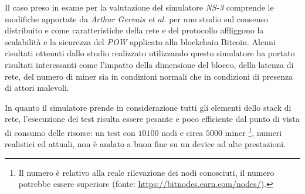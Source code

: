 Il caso preso in esame per la valutazione del simulatore \textit{NS-3} comprende le modifiche apportate da \textit{Arthur Gervais et al.} per uno studio sul consenso distribuito e come caratteristiche della rete e del protocollo affliggono la scalabilità e la sicurezza del \textit{POW} applicato alla blockchain Bitcoin.\newline
Alcuni risultati ottenuti dallo studio realizzato utilizzando questo simulatore ha portato risultati interessanti come l'impatto della dimensione del blocco, della latenza di rete, del numero di miner sia in condizioni normali che in condizioni di presenza di attori malevoli.
\begin{table}
    \centering
    \caption{Numero di blocchi \textit{stale} e transazioni per secondo raggiungibili con 16 miner nella rete e diverse dimensioni dei blocchi}
\end{table}
In quanto il simulatore prende in considerazione tutti gli elementi dello stack di rete, l'esecuzione dei test risulta essere pesante e poco efficiente dal punto di vista di consumo delle risorse: un test con $10100$ nodi e circa $5000$ miner \footnote{Il numero è relativo alla reale rilevazione dei nodi conosciuti, il numero potrebbe essere superiore (fonte: \href{https://bitnodes.earn.com/nodes/}{https://bitnodes.earn.com/nodes/}).}, numeri realistici ed attuali, non è andato a buon fine su un device ad alte prestazioni.\newline
